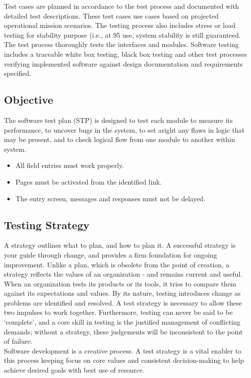 \documentclass[12pt]{report}
\begin{document}
Test cases are planned in accordance to the test process and documented with detailed test 
descriptions. These test cases use cases based on projected operational mission scenarios. 
The testing process also includes stress or load testing for stability purpose (i.e., at 95%
use, system stability is still guaranteed. The test process thoroughly tests the interfaces and 
modules. Software testing includes a traceable white box testing, black box testing and other 
test processes verifying implemented software against design documentation and 
requirements specified.


\subsection{Objective
}
\justifying
\setlength{\parindent}{4em}
\setlength{\parskip}{0.5em}
\renewcommand{\baselinestretch}{1.5}
\normalsize

The software test plan (STP) is designed to test each module to measure its performance, to 
uncover bugs in the system, to set aright any flaws in logic that may be present, and to check 
logical flow from one module to another within system.
\begin{itemize}
\item All field entries must work properly.
\item Pages must be activated from the identified link.
\item The entry screen, messages and responses must not be delayed.

\end {itemize}


\subsection{Testing Strategy
}
\justifying
\setlength{\parindent}{4em}
\setlength{\parskip}{0.5em}
\renewcommand{\baselinestretch}{1.5}
\normalsize

A strategy outlines what to plan, and how to plan it. A successful strategy is your guide 
through change, and provides a firm foundation for ongoing improvement. Unlike a plan, 
which is obsolete from the point of creation, a strategy reflects the values of an organization 
- and remains current and useful. When an organization tests its products or its tools, it tries 
to compare them against its expectations and values. By its nature, testing introduces change 
as problems are identified and resolved. A test strategy is necessary to allow these two 
impulses to work together. Furthermore, testing can never be said to be ‘complete’, and a 
core skill in testing is the justified management of conflicting demands; without a strategy, 
these judgements will be inconsistent to the point of failure.\\
Software development is a creative process. A test strategy is a vital enabler to this process 
keeping focus on core values and consistent decision-making to help achieve desired goals 
with best use of resource. 
\end{document}

